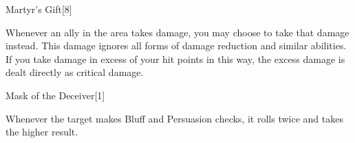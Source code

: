 \begin{spellsection}{Martyr's Gift}[8]
    \begin{spellheader}
    \end{spellheader}
    \begin{spellcontent}
        \begin{spelltargetinginfo}
        \end{spelltargetinginfo}
        \begin{spelleffects}
            \spelleffect Whenever an ally in the area takes damage, you may choose to take that damage instead. This damage ignores all forms of damage reduction and similar abilities. If you take damage in excess of your hit points in this way, the excess damage is dealt directly as critical damage.
        \end{spelleffects}
    \end{spellcontent}
    \begin{spellfooter}
        \miscastexplode
    \end{spellfooter}
\end{spellsection}

\begin{spellsection}{Mask of the Deceiver}[1]
    \begin{spellheader}
    \end{spellheader}
    \begin{spellcontent}
        \begin{spelltargetinginfo}
        \end{spelltargetinginfo}
        \begin{spelleffects}
            \spelleffect Whenever the target makes Bluff and Persuasion checks, it rolls twice and takes the higher result.
            \spelldur \durshort
        \end{spelleffects}
    \end{spellcontent}
    \begin{spellfooter}
        \miscastexplode
    \end{spellfooter}
    \begin{spellaugments}
    \end{spellaugments}
\end{spellsection}


